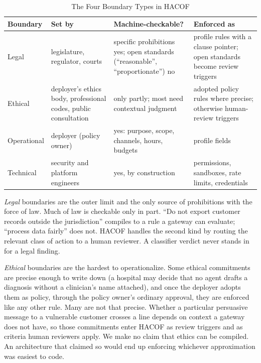 \documentclass[journal]{IEEEtran}
\newcommand{\hacof}{HACOF}
\begin{document}
\begin{table}[!t]
\caption{The Four Boundary Types in \hacof}
\label{tab:boundaries}
\centering
\footnotesize
\setlength{\tabcolsep}{3pt}
\begin{tabular}{>{\raggedright\arraybackslash}p{1.45cm}>{\raggedright\arraybackslash}p{1.7cm}>{\raggedright\arraybackslash}p{2.1cm}>{\raggedright\arraybackslash}p{1.9cm}}
\toprule
\rowcolor{darkblue!15}
\textbf{Boundary} & \textbf{Set by} & \textbf{Machine-checkable?} & \textbf{Enforced as} \\
\midrule
Legal & legislature, regulator, courts & specific prohibitions yes; open standards (``reasonable'', ``proportionate'') no & profile rules with a clause pointer; open standards become review triggers \\
\rowcolor{darkblue!5}
Ethical & deployer's ethics body, professional codes, public consultation & only partly; most need contextual judgment & adopted policy rules where precise; otherwise human-review triggers \\
Operational & deployer (policy owner) & yes: purpose, scope, channels, hours, budgets & profile fields \\
\rowcolor{darkblue!5}
Technical & security and platform engineers & yes, by construction & permissions, sandboxes, rate limits, credentials \\
\bottomrule
\end{tabular}
\end{table}

\textit{Legal} boundaries are the outer limit and the only source of prohibitions with the force of law. Much of law is checkable only in part. ``Do not export customer records outside the jurisdiction'' compiles to a rule a gateway can evaluate; ``process data fairly'' does not. \hacof{} handles the second kind by routing the relevant class of action to a human reviewer. A classifier verdict never stands in for a legal finding.

\textit{Ethical} boundaries are the hardest to operationalize. Some ethical commitments are precise enough to write down (a hospital may decide that no agent drafts a diagnosis without a clinician's name attached), and once the deployer adopts them as policy, through the policy owner's ordinary approval, they are enforced like any other rule. Many are not that precise. Whether a particular persuasive message to a vulnerable customer crosses a line depends on context a gateway does not have, so those commitments enter \hacof{} as review triggers and as criteria human reviewers apply. We make no claim that ethics can be compiled. An architecture that claimed so would end up enforcing whichever approximation was easiest to code.
\end{document}
